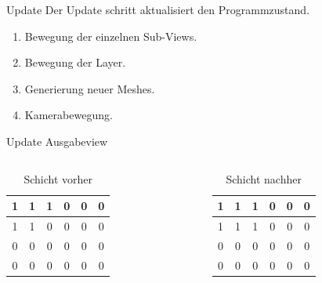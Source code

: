 \documentclass{presentation}
\begin{document}
\begin{frame}{Update}
	Der Update schritt aktualisiert den Programmzustand.
	
    \begin{enumerate}
        \item Bewegung der einzelnen Sub-Views.
        \item Bewegung der Layer.
        \item Generierung neuer Meshes.
        \item Kamerabewegung.
    \end{enumerate}
\end{frame}

\begin{frame}[fragile]{Update Ausgabeview}
    \begin{columns}
        \begin{table}
            \begin{tabular}{| c | c | c | c | c | c |}
                \hline
                \cellcolor{red}1 & \cellcolor{red}1 & \cellcolor{red}1 & 0 & 0 & 0 \\
                \hline
                \cellcolor{green}1 & \cellcolor{green}1 & 0 & 0 & 0 & 0 \\
                \hline
                0 & 0 & 0 & 0 & 0 & 0 \\
                \hline
                0 & 0 & 0 & 0 & 0 & 0 \\
                \hline
            \end{tabular}
            \caption{Schicht vorher}
        \end{table}

        \begin{table}
            \begin{tabular}{| c | c | c | c | c | c |}
                \hline
                \cellcolor{red}1 & \cellcolor{red}1 & \cellcolor{red}1 & 0 & 0 & 0 \\
                \hline
                \cellcolor{red}1 & \cellcolor{red}1 & \cellcolor{red}1 & 0 & 0 & 0 \\
                \hline
                0 & 0 & 0 & 0 & 0 & 0 \\
                \hline
                0 & 0 & 0 & 0 & 0 & 0 \\
                \hline
            \end{tabular}
            \caption{Schicht nachher}
        \end{table}
    \end{columns}
    

\end{frame}
\end{document}

